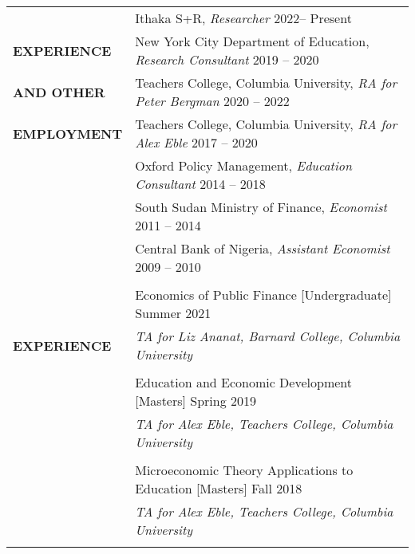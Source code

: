 \documentclass[letterpaper, 11pt]{article}
\begin{document}
\begin{longtable}{p{1.2in}p{4.8in}}
\nohyphens{{\textbf{RESEARCH}} 
& Ithaka S+R, \textit{Researcher} \hfill 2022-- Present \\
\textbf{{EXPERIENCE}}} 
& New York City Department of Education, \textit{Research Consultant}   \hfill 2019 -- 2020 \\ 
\textbf{{AND OTHER}}
&   Teachers College, Columbia University, \textit{RA for Peter Bergman}  \hfill 2020 -- 2022 \\
\textbf{{EMPLOYMENT}}
& Teachers College, Columbia University, \textit{RA for Alex Eble} \hfill 2017 -- 2020 \\ 
& Oxford Policy Management, \textit{Education Consultant}  \hfill 2014 -- 2018 \\
& South Sudan Ministry of Finance, \textit{Economist}  \hfill 2011 -- 2014 \\
& Central Bank of Nigeria, \textit{Assistant Economist}  \hfill 2009 -- 2010 \\
& \\



{\textbf{{TEACHING}} 
& Economics of Public Finance [Undergraduate] \hfill Summer 2021 \\ \textbf{{EXPERIENCE}}} 
& \textit{TA for Liz Ananat, Barnard College, Columbia University} \hfill  \\  \\
& Education and Economic Development  [Masters] 
\hfill Spring 2019 \\  
& \textit{TA for Alex Eble, Teachers College, Columbia University} \hfill \\   \\
& Microeconomic Theory Applications to Education  [Masters]  
\hfill Fall 2018 \\ 
& \textit{TA for Alex Eble, Teachers College, Columbia University} \hfill \\ \\





\end{longtable}
\end{document}
